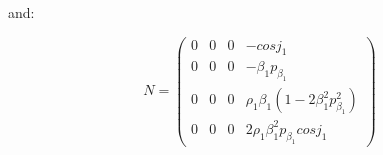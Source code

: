 \documentclass[workdone.tex]{subfiles}
\begin{document}
and:

\begin{equation}
N = \begin{pmatrix}
0 & 0 & 0 & - cos j_1 \\
0 & 0 & 0 & - \beta_1 p_{\beta_1} \\
0 & 0 & 0 & \rho_1 \beta_1 (1 - 2 \beta_1^2 p_{\beta_1}^2) \\
0 & 0 & 0 & 2 \rho_1 \beta_1^2 p_{\beta_1} cos j_1
\end{pmatrix}
\end{equation}
\end{document}
